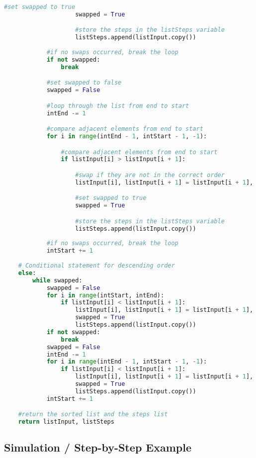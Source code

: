 \documentclass{article}
\begin{document}
\begin{lstlisting}[language=Python]
                    #set swapped to true
                    swapped = True

                    #store the steps in the listSteps variable
                    listSteps.append(listInput.copy())
            
            #if no swaps occurred, break the loop
            if not swapped:
                break

            #set swapped to false
            swapped = False

            #loop through the list from end to start
            intEnd -= 1

            #compare adjacent elements from end to start
            for i in range(intEnd - 1, intStart - 1, -1):

                #compare adjacent elements from end to start
                if listInput[i] > listInput[i + 1]:

                    #swap if they are not in the correct order
                    listInput[i], listInput[i + 1] = listInput[i + 1], listInput[i]

                    #set swapped to true
                    swapped = True

                    #store the steps in the listSteps variable
                    listSteps.append(listInput.copy())
            
            #if no swaps occurred, break the loop
            intStart += 1
    
    # Conditional statement for descending order
    else:
        while swapped:
            swapped = False
            for i in range(intStart, intEnd):
                if listInput[i] < listInput[i + 1]:
                    listInput[i], listInput[i + 1] = listInput[i + 1], listInput[i]
                    swapped = True
                    listSteps.append(listInput.copy())
            if not swapped:
                break
            swapped = False
            intEnd -= 1
            for i in range(intEnd - 1, intStart - 1, -1):
                if listInput[i] < listInput[i + 1]:
                    listInput[i], listInput[i + 1] = listInput[i + 1], listInput[i]
                    swapped = True
                    listSteps.append(listInput.copy())
            intStart += 1

    #return the sorted list and the steps list
    return listInput, listSteps
\end{lstlisting}

\subsection*{Simulation / Step-by-Step Example}
\end{document}
